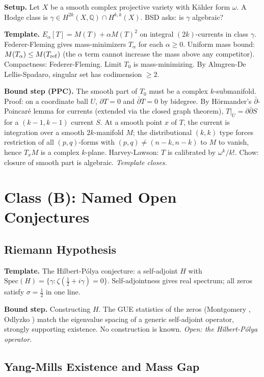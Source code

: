 \documentclass[12pt]{article}
\theoremstyle{remark}
\begin{document}
\textbf{Setup.} Let $X$ be a smooth complex projective variety with Kähler form
$\omega$. A Hodge class is $\gamma\in H^{2k}(X,\mathbb{Q})\cap H^{k,k}(X)$.
BSD asks: is $\gamma$ algebraic?

\textbf{Template.}
$E_\alpha[T] = M(T) + \alpha M(T)^2$ on integral $(2k)$-currents in class $\gamma$.
Federer-Fleming gives mass-minimizers $T_\alpha$ for each $\alpha\geq 0$.
Uniform mass bound: $M(T_\alpha)\leq M(T_{\rm ref})$ (the $\alpha$ term cannot
increase the mass above any competitor). Compactness: Federer-Fleming.
Limit $T_0$ is mass-minimizing. By Almgren-De Lellis-Spadaro, singular set has
codimension $\geq 2$.

\textbf{Bound step (PPC).} The smooth part of $T_0$ must be a complex $k$-submanifold.
Proof: on a coordinate ball $U$, $\partial T = 0$ and $\bar\partial T = 0$ by
bidegree. By Hörmander's $\bar\partial$-Poincaré lemma for currents (extended via
the closed graph theorem), $T|_U = \partial\bar\partial S$ for a $(k-1,k-1)$
current $S$. At a smooth point $x$ of $T$, the current is integration over a
smooth $2k$-manifold $M$; the distributional $(k,k)$ type forces restriction of all
$(p,q)$-forms with $(p,q)\neq(n-k,n-k)$ to $M$ to vanish, hence $T_xM$ is a
complex $k$-plane. Harvey-Lawson: $T$ is calibrated by $\omega^k/k!$. Chow:
closure of smooth part is algebraic. \emph{Template closes.} \checkmark

\section{Class (B): Named Open Conjectures}

\subsection{Riemann Hypothesis}

\textbf{Template.} The Hilbert-Pólya conjecture: a self-adjoint $H$ with
$\mathrm{Spec}(H) = \{\gamma:\zeta(\tfrac12+i\gamma)=0\}$. Self-adjointness
gives real spectrum; all zeros satisfy $\sigma=\tfrac12$ in one line.

\textbf{Bound step.} Constructing $H$. The GUE statistics of the zeros
(Montgomery \cite{montgomery1973}, Odlyzko \cite{odlyzko1987}) match the
eigenvalue spacing of a generic self-adjoint operator, strongly supporting
existence. No construction is known.
\textit{Open: the Hilbert-P\'olya operator.}

\subsection{Yang-Mills Existence and Mass Gap}
\end{document}
